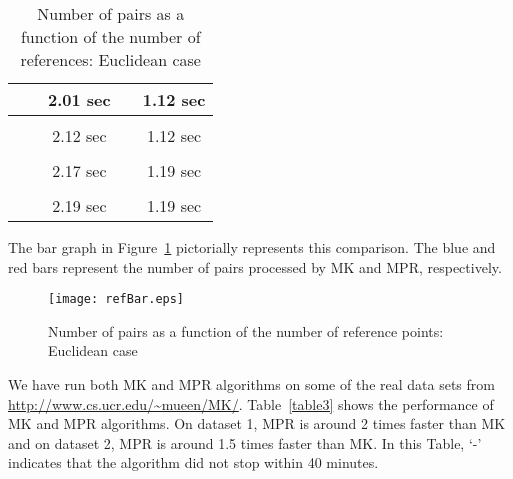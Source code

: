 \documentclass{article}
\theoremstyle{definition}
\theoremstyle{remark}
\begin{document}
\begin{table}[ht]
{\begin{tabular}{|c|c|c|c|c|}
 &  & 2.01 sec &  & 1.12 sec\\ [1ex]      \hline                  & & & &\\
 &  & 2.12 sec &  & 1.12 sec\\ [1ex]      \hline
& & & &\\
 &  & 2.17 sec &  & 1.19 sec\\ [1ex]      \hline
& & & &\\
 &  & 2.19 sec &  & 1.19 sec\\ [1ex]      \hline
\end{tabular}}
\vspace{0.2in}
\caption{Number of pairs as a function of \protect\linebreak the number of references: Euclidean case}\label{table2} \end{table}

The bar graph in Figure~\ref{figure3} pictorially represents this comparison. The blue and red bars represent the number of pairs processed by MK and MPR, respectively.

\begin{figure}[h]
\texttt{[image: refBar.eps]}
\caption{Number of pairs as a function of the number of reference points: Euclidean case}\label{figure3}
\end{figure}

We have run both MK and MPR algorithms on some of the real data sets from \url{http://www.cs.ucr.edu/~mueen/MK/}. Table~\ref{table3} shows the performance of MK and MPR algorithms. On dataset 1, MPR is around 2 times faster than MK and on dataset 2, MPR is around 1.5 times faster than MK. In this Table, `-' indicates that the algorithm did not stop within 40 minutes.

\begin{table}[ht]
\centering  {}
\vspace{0.2in}
\caption{Comparison with Real Data sets. \protect\newline Data set 1: ; \protect\newline Data set 2: ; \protect\newline Data set 3: }\label{table3} \end{table}
\end{document}
